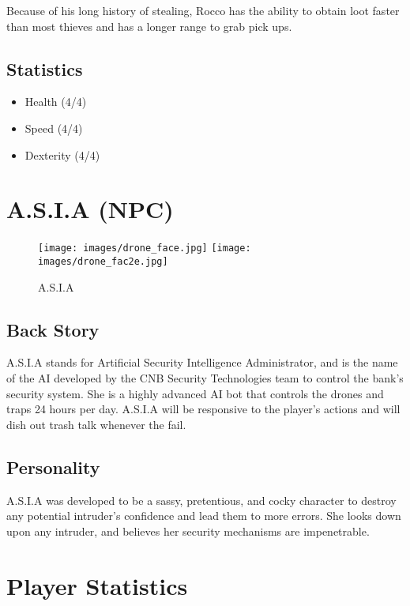 \documentclass[10pt]{report}
\begin{document}
\begin{multicols}{2}
    Because of his long history of stealing, Rocco has the ability to obtain loot faster than most thieves and has a longer range to grab pick ups.
    
    \subsection{Statistics}
    \begin{itemize}
        \item Health (4/4)
        \item Speed (4/4)
        \item Dexterity (4/4)
    \end{itemize}
\end{multicols}

\pagebreak

\section{A.S.I.A (NPC)}

\begin{figure}[H]
    \centering
    \texttt{[image: images/drone\_face.jpg]}
    \texttt{[image: images/drone\_fac2e.jpg]}
    \caption{A.S.I.A}
\end{figure}

\subsection{Back Story}

A.S.I.A stands for Artificial Security Intelligence Administrator, and is the name of the AI developed by the CNB Security Technologies team to control the bank’s security system. She is a highly advanced AI bot that controls the drones and traps 24 hours per day. A.S.I.A will be responsive to the player’s actions and will dish out trash talk whenever the fail.

\subsection{Personality}

A.S.I.A was developed to be a sassy, pretentious, and cocky character to destroy any potential intruder’s confidence and lead them to more errors. She looks down upon any intruder, and believes her security mechanisms are impenetrable.

\section{Player Statistics}
\end{document}
